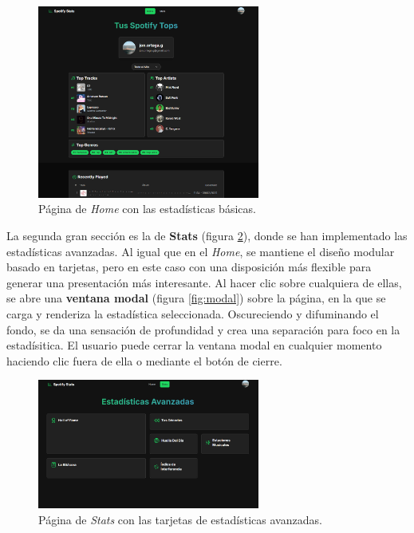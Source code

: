 \begin{figure}[H]
    \centering
    \includegraphics[width=0.65\textwidth]{figures/capturas_ui/home.png}
    \caption{Página de \textit{Home} con las estadísticas básicas.}
    \label{fig:home}
\end{figure}

La segunda gran sección es la de \textbf{Stats} (figura \ref{fig:stats}), donde se han implementado las estadísticas avanzadas. Al igual que en el \textit{Home}, se mantiene el diseño modular basado en tarjetas, pero en este caso con una disposición más flexible para generar una presentación más interesante. Al hacer clic sobre cualquiera de ellas, se abre una \textbf{ventana modal} (figura \ref{fig:modal}) sobre la página, en la que se carga y renderiza la estadística seleccionada. Oscureciendo y difuminando el fondo, se da una sensación de profundidad y crea una separación para foco en la estadísitica. El usuario puede cerrar la ventana modal en cualquier momento haciendo clic fuera de ella o mediante el botón de cierre.

\begin{figure}[H]
    \centering
    \includegraphics[width=0.65\textwidth]{figures/capturas_ui/stats.png}
    \caption{Página de \textit{Stats} con las tarjetas de estadísticas avanzadas.}
    \label{fig:stats}
\end{figure}

